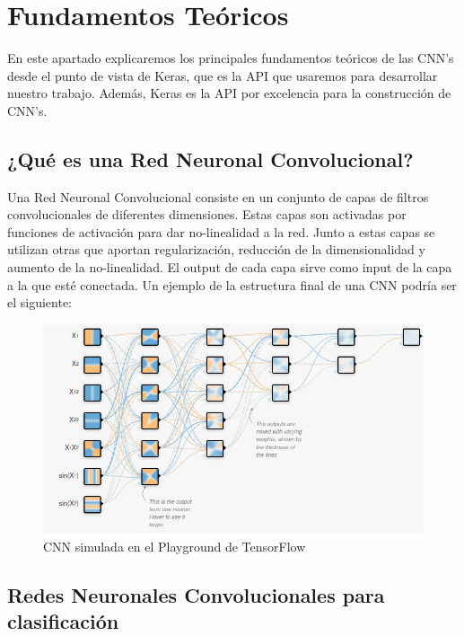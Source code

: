 \section{Fundamentos Teóricos}

\vspace{5 mm}

En este apartado explicaremos los principales fundamentos teóricos de las CNN's desde el punto de vista de Keras, que es la API que usaremos para desarrollar nuestro trabajo. Además, Keras es la API por excelencia para la construcción de CNN's.

\vspace{1 cm}

\subsection{¿Qué es una Red Neuronal Convolucional?}

\vspace{5 mm}

Una Red Neuronal Convolucional consiste en un conjunto de capas de filtros convolucionales de diferentes dimensiones. Estas capas son activadas por funciones de activación para dar no-linealidad a la red. Junto a estas capas se utilizan otras que aportan regularización, reducción de la dimensionalidad y aumento de la no-linealidad. El output de cada capa sirve como input de la capa a la que esté conectada. Un ejemplo de la estructura final de una CNN podría ser el siguiente:

\vspace{5 mm}

\begin{figure}[H]
  \centering
  \includegraphics[width=0.5\linewidth]{Imagenes/cnn.png}
  \caption{CNN simulada en el Playground de TensorFlow}
  \label{fig:sub-first}
\end{figure}

\vspace{1 cm}

\subsection{Redes Neuronales Convolucionales para clasificación}

